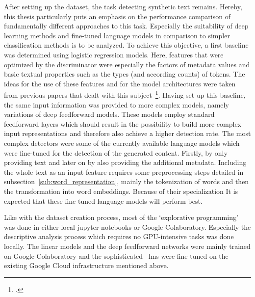 After setting up the dataset, the task detecting synthetic text remains. Hereby, this thesis particularly puts an emphasis on the performance comparison of fundamentally different approaches to this task. Especially the suitability of deep learning methods and fine-tuned language models in comparison to simpler classification methods is to be analyzed. To achieve this objective, a first baseline was determined using logistic regression models. Here, features that were optimized by the discriminator were especially the factors of metadata values and basic textual properties such as the types (and according counts) of tokens. The ideas for the use of these features and for the model architectures were taken from previous papers that dealt with this subject~\footcite{lavergne2008detecting,beresneva2016computer}. Having set up this baseline, the same input information was provided to more complex models, namely variations of deep feedforward models. These models employ standard feedforward layers which should result in the possibility to build more complex input representations and therefore also achieve a higher detection rate. The most complex detectors were some of the currently available language models which were fine-tuned for the detection of the generated content. Firstly, by only providing text and later on by also providing the additional metadata. Including the whole text as an input feature requires some preprocessing steps detailed in subsection~\ref{sub:word_representation}, mainly the tokenization of words and then the transformation into word embeddings. Because of their specialization It is expected that these fine-tuned language models will perform best.

Like with the dataset creation process, most of the `explorative programming' was done in either local jupyter notebooks or Google Colaboratory. Especially the descriptive analysis process which requires no GPU-intensive tasks was done locally. The linear models and the deep feedforward networks were mainly trained on Google Colaboratory and the sophisticated ~\gls{lm}s were fine-tuned on the existing Google Cloud infrastructure mentioned above.




